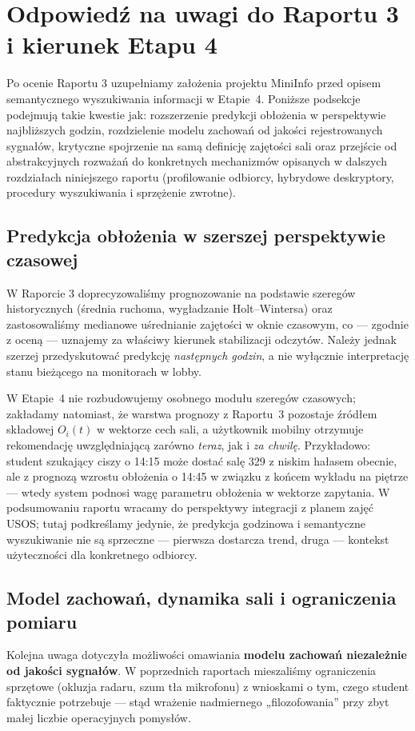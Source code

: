 \documentclass[14pt,a4paper]{extarticle}
\begin{document}
\section{Odpowiedź na uwagi do Raportu 3 i kierunek Etapu 4}

Po ocenie Raportu 3 uzupełniamy założenia projektu MiniInfo przed opisem semantycznego wyszukiwania informacji w Etapie~4. Poniższe podsekcje podejmują takie kwestie jak: rozszerzenie predykcji obłożenia w perspektywie najbliższych godzin, rozdzielenie modelu zachowań od jakości rejestrowanych sygnałów, krytyczne spojrzenie na samą definicję zajętości sali oraz przejście od abstrakcyjnych rozważań do konkretnych mechanizmów opisanych w dalszych rozdziałach niniejszego raportu (profilowanie odbiorcy, hybrydowe deskryptory, procedury wyszukiwania i sprzężenie zwrotne).

\subsection{Predykcja obłożenia w szerszej perspektywie czasowej}
W Raporcie 3 doprecyzowaliśmy prognozowanie na podstawie szeregów historycznych (średnia ruchoma, wygładzanie Holt--Wintersa) oraz zastosowaliśmy medianowe uśrednianie zajętości w oknie czasowym, co --- zgodnie z oceną --- uznajemy za właściwy kierunek stabilizacji odczytów. Należy jednak szerzej przedyskutować predykcję \emph{następnych godzin}, a nie wyłącznie interpretację stanu bieżącego na monitorach w lobby.

W Etapie~4 nie rozbudowujemy osobnego modułu szeregów czasowych; zakładamy natomiast, że warstwa prognozy z Raportu~3 pozostaje źródłem składowej $O_i(t)$ w wektorze cech sali, a użytkownik mobilny otrzymuje rekomendację uwzględniającą zarówno \emph{teraz}, jak i \emph{za chwilę}. Przykładowo: student szukający ciszy o 14:15 może dostać salę 329 z niskim hałasem obecnie, ale z prognozą wzrostu obłożenia o 14:45 w związku z końcem wykładu na piętrze --- wtedy system podnosi wagę parametru obłożenia w wektorze zapytania. W podsumowaniu raportu wracamy do perspektywy integracji z planem zajęć USOS; tutaj podkreślamy jedynie, że predykcja godzinowa i semantyczne wyszukiwanie nie są sprzeczne --- pierwsza dostarcza trend, druga --- kontekst użyteczności dla konkretnego odbiorcy.

\subsection{Model zachowań, dynamika sali i ograniczenia pomiaru}
Kolejna uwaga dotyczyła możliwości omawiania \textbf{modelu zachowań niezależnie od jakości sygnałów}. W poprzednich raportach mieszaliśmy ograniczenia sprzętowe (okluzja radaru, szum tła mikrofonu) z wnioskami o tym, czego student faktycznie potrzebuje --- stąd wrażenie nadmiernego „filozofowania” przy zbyt małej liczbie operacyjnych pomysłów.
\end{document}
